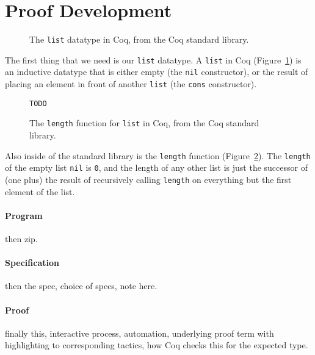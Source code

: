 \section{Proof Development}
\label{sec:mot-dev}

\begin{figure}
   
\caption{The \lstinline{list} datatype in Coq, from the Coq standard library.}
\label{fig:list}
\end{figure}

The first thing that we need is our \lstinline{list} datatype.
A \lstinline{list} in Coq (Figure~\ref{fig:list}) is an inductive datatype that is either empty (the \lstinline{nil} constructor), or the result
of placing an element in front of another \lstinline{list} (the \lstinline{cons} constructor).

\begin{figure}
\begin{lstlisting}
TODO
\end{lstlisting}
\caption{The \lstinline{length} function for \lstinline{list} in Coq, from the Coq standard library.}
\label{fig:length}
\end{figure}

Also inside of the standard library is the \lstinline{length} function (Figure~\ref{fig:length}).
The \lstinline{length} of the empty list \lstinline{nil} is \lstinline{0}, and the length of any other list
is just the successor of (one plus) the result of recursively calling \lstinline{length} on everything but the first element of the list.	

\paragraph{Program}
then zip.

\paragraph{Specification}
then the spec, choice of specs, note here.

\paragraph{Proof}
finally this, interactive process, automation, underlying proof term with highlighting to corresponding tactics,
how Coq checks this for the expected type.

